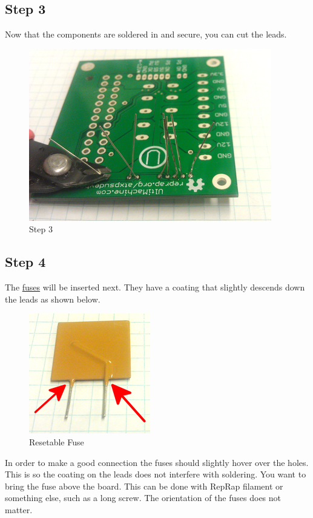 \subsection{Step 3}

Now that the components are soldered in and secure, you can cut the
leads.

\begin{figure}[H]
\centering
\includegraphics{./png/step-03.png}
\caption{Step 3}
\end{figure}

\subsection{Step 4}

The \href{http://en.wikipedia.org/wiki/Fuse_\%28electrical\%29}{fuses}
will be inserted next. They have a coating that slightly descends down
the leads as shown below.

\begin{figure}[H]
\centering
\includegraphics{./png/fuse.png}
\caption{Resetable Fuse}
\end{figure}

In order to make a good connection the fuses should slightly hover over
the holes. This is so the coating on the leads does not interfere with
soldering. You want to bring the fuse above the board. This can be done
with RepRap filament or something else, such as a long screw. The
orientation of the fuses does not matter.

